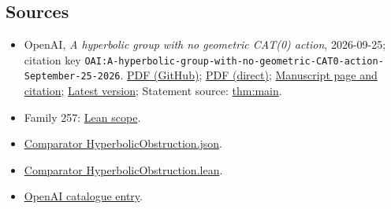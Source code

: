 \documentclass[11pt]{article}
\begin{document}
\subsection{Sources}
\begin{itemize}
\item OpenAI, \emph{A hyperbolic group with no geometric CAT(0) action}, 2026-09-25; citation key \texttt{OAI:A-hyperbolic-group-with-no-geometric-CAT0-action-September-25-2026}. \href{https://github.com/openai/math/blob/adc7f1241b42e322a6451854ab7e4b4c146bf78a/preprints/A-hyperbolic-group-with-no-geometric-CAT0-action-September-25-2026/paper.pdf}{PDF (GitHub)}; \href{https://github.com/openai/math/raw/adc7f1241b42e322a6451854ab7e4b4c146bf78a/preprints/A-hyperbolic-group-with-no-geometric-CAT0-action-September-25-2026/paper.pdf}{PDF (direct)}; \href{https://github.com/openai/math/blob/adc7f1241b42e322a6451854ab7e4b4c146bf78a/preprints/A-hyperbolic-group-with-no-geometric-CAT0-action-September-25-2026/README.md}{Manuscript page and citation}; \href{https://github.com/openai/math/blob/main/preprints/A-hyperbolic-group-with-no-geometric-CAT0-action-September-25-2026/paper.pdf}{Latest version}; Statement source: \href{https://github.com/openai/math/blob/adc7f1241b42e322a6451854ab7e4b4c146bf78a/preprints/A-hyperbolic-group-with-no-geometric-CAT0-action-September-25-2026/build/sections/01-introduction.tex\#L6}{thm:main}.
\item Family 257: \href{https://github.com/openai/math/blob/adc7f1241b42e322a6451854ab7e4b4c146bf78a/lean/docs/257.md}{Lean scope}.
\item \href{https://github.com/openai/math/blob/adc7f1241b42e322a6451854ab7e4b4c146bf78a/lean/ComparatorChallenges/HyperbolicObstruction.json}{Comparator HyperbolicObstruction.json}.
\item \href{https://github.com/openai/math/blob/adc7f1241b42e322a6451854ab7e4b4c146bf78a/lean/ComparatorChallenges/HyperbolicObstruction.lean}{Comparator HyperbolicObstruction.lean}.
\item \href{https://github.com/openai/math/blob/adc7f1241b42e322a6451854ab7e4b4c146bf78a/CONTENTS.md}{OpenAI catalogue entry}.
\end{itemize}
\end{document}
